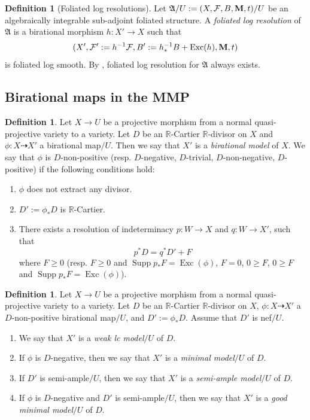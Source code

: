 \documentclass[12pt]{amsart}
\numberwithin{equation}{section}
\newcommand{\Mm}{{\bf{M}}}
\newcommand{\Rr}{\mathbb{R}}
\newcommand{\Exc}{\operatorname{Exc}}
\newcommand{\Supp}{\operatorname{Supp}}
\newcommand{\Aa}{{\mathfrak{A}}}
\newcommand{\Ff}{\mathcal{F}}
\theoremstyle{definition}
\newtheorem{defn}[thm]{Definition}
\theoremstyle{definition}
\theoremstyle{definition}
\begin{document}
\begin{defn}[Foliated log resolutions]\label{defn: log resolution}
Let $\Aa/U:=(X,\Ff,B,\Mm,t)/U$ be an algebraically integrable sub-adjoint foliated structure. A \emph{foliated log resolution} of $\Aa$ is a birational morphism $h: X'\rightarrow X$ such that 
$$(X',\Ff':=h^{-1}\Ff,B':=h^{-1}_\ast B+\Exc(h),\Mm,t)$$ 
is foliated log smooth. By \cite[Lemma 6.2.4]{CHLX23}, foliated log resolution for $\Aa$ always exists.
\end{defn}

\subsection{Birational maps in the MMP}

\begin{defn}
    Let $X\rightarrow U$ be a projective morphism from a normal quasi-projective variety to a variety.  Let $D$ be an $\Rr$-Cartier $\Rr$-divisor on $X$ and $\phi: X\dashrightarrow X'$ a birational map$/U$. Then we say that $X'$ is a \emph{birational model} of $X$. We say that $\phi$ is $D$-non-positive (resp. $D$-negative, $D$-trivial, $D$-non-negative, $D$-positive) if the following conditions hold:
    \begin{enumerate}
    \item $\phi$ does not extract any divisor.
    \item $D':=\phi_\ast D$ is $\Rr$-Cartier.
    \item There exists a resolution of indeterminacy $p: W\rightarrow X$ and $q: W\rightarrow X'$, such that
    $$p^\ast D=q^\ast D'+F$$
    where $F\geq 0$ (resp. $F\geq 0$ and $\Supp p_\ast F=\Exc(\phi)$, $F=0$, $0\geq F$, $0\geq F$ and $\Supp p_\ast F=\Exc(\phi)$).
    \end{enumerate}
\end{defn}


\begin{defn} Let $X\rightarrow U$ be a projective morphism from a normal quasi-projective variety to a variety. Let $D$ be an $\Rr$-Cartier $\Rr$-divisor on $X$, $\phi: X\dashrightarrow X'$ a $D$-non-positive birational map$/U$, and $D':=\phi_\ast D$. Assume that $D'$ is nef$/U$.
\begin{enumerate}
    \item We say that $X'$ is a \emph{weak lc model}$/U$ of $D$.
    \item If $\phi$ is $D$-negative, then we say that $X'$ is a \emph{minimal model}$/U$ of $D$.
    \item If $D'$ is semi-ample$/U$, then we say that $X'$ is a \emph{semi-ample model}$/U$ of $D$.
    \item If $\phi$ is $D$-negative and $D'$ is semi-ample$/U$, then we say that $X'$ is a \emph{good minimal model}$/U$ of $D$.
\end{enumerate}
\end{defn}
\end{document}
